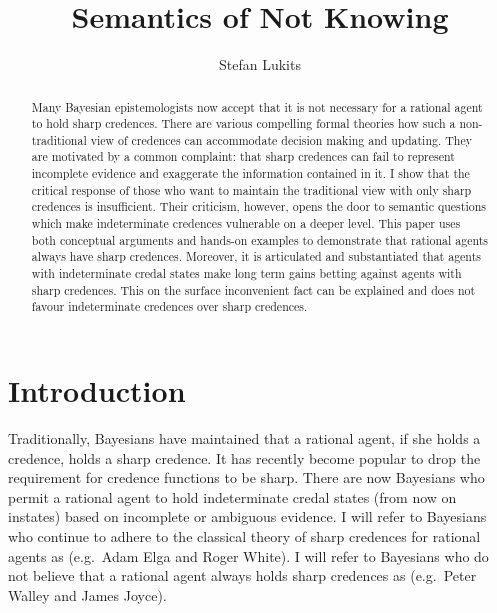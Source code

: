 \documentclass[11pt]{article}
\begin{document}

\title{Semantics of Not Knowing}
\author{Stefan Lukits}
\date{}
\maketitle
{}

\begin{abstract} 
  {\noindent}Many Bayesian epistemologists now accept
  that it is not necessary for a rational agent to hold sharp
  credences. There are various compelling formal theories how such a
  non-traditional view of credences can accommodate decision making
  and updating. They are motivated by a common complaint: that sharp
  credences can fail to represent incomplete evidence and exaggerate
  the information contained in it. I show that the critical response
  of those who want to maintain the traditional view with only sharp
  credences is insufficient. Their criticism, however, opens the door
  to semantic questions which make indeterminate credences vulnerable
  on a deeper level. This paper uses both conceptual arguments and
  hands-on examples to demonstrate that rational agents always have
  sharp credences. Moreover, it is articulated and substantiated that
  agents with indeterminate credal states make long term gains betting
  against agents with sharp credences. This on the surface
  inconvenient fact can be explained and does not favour indeterminate
  credences over sharp credences.
\end{abstract}

\section{Introduction}
\label{Introduction}

Traditionally, Bayesians have maintained that a rational agent, if she
holds a credence, holds a sharp credence. It has recently become
popular to drop the requirement for credence functions to be sharp.
There are now Bayesians who permit a rational agent to hold
indeterminate credal states (from now on instates) based on incomplete
or ambiguous evidence. I will refer to Bayesians who continue to
adhere to the classical theory of sharp credences for rational agents
as  (e.g.\ Adam Elga and Roger White). I will refer
to Bayesians who do not believe that a rational agent always holds
sharp credences as  (e.g.\ Peter Walley and James
Joyce).
\end{document}
